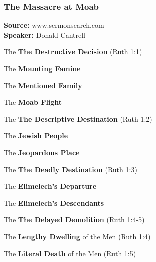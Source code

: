 \subsubsection{The Massacre at Moab}
\textbf{Source: }www.sermonsearch.com\\
\textbf{Speaker: }Donald Cantrell\\
\begin{compactenum}[I.][7]
    \item The \textbf{The Destructive Decision} (Ruth 1:1)
    \begin{compactenum}[A.]
    	\item The \textbf{Mounting Famine} 
    	\item The \textbf{Mentioned Family} 
    	\item The \textbf{Moab Flight} 
    \end{compactenum}
    \item The \textbf{The Descriptive Destination} (Ruth 1:2)
    \begin{compactenum}[A.]
    	\item The \textbf{Jewish People} 
    	\item The \textbf{Jeopardous Place} 
    \end{compactenum}
    \item The \textbf{The Deadly Destination} (Ruth 1:3)
    \begin{compactenum}[A.]
    	\item The \textbf{Elimelech's Departure} 
    	\item The \textbf{Elimelech's Descendants} 
    \end{compactenum}
    \item The \textbf{The Delayed Demolition} (Ruth 1:4-5)
    \begin{compactenum}[A.]
    	\item The \textbf{Lengthy Dwelling} of the Men (Ruth 1:4)
    	\item The \textbf{Literal Death} of the Men (Ruth 1:5)
    \end{compactenum}
\end{compactenum}


